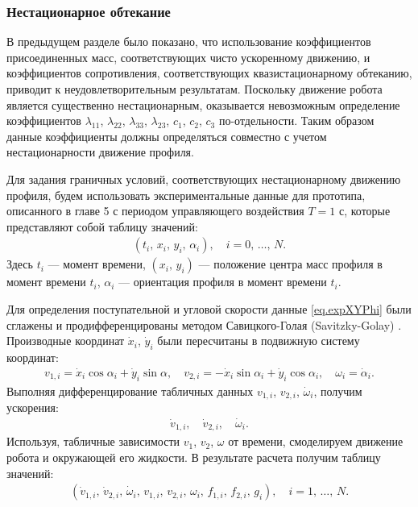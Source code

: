 \subsubsection*{Нестационарное обтекание}\label{ssec.unsteady}


В предыдущем разделе было показано, что использование коэффициентов присоединенных масс, соответствующих чисто ускоренному движению, и коэффициентов сопротивления, соответствующих квазистационарному обтеканию, приводит к неудовлетворительным результатам. Поскольку движение робота является существенно нестационарным, оказывается невозможным определение коэффициентов $\lambda_{11}$, $\lambda_{22}$, $\lambda_{33}$, $\lambda_{23}$, $c_1$, $c_2$, $c_3$ по-отдельности. Таким образом данные коэффициенты должны определяться совместно с учетом нестационарности движение профиля.

Для задания граничных условий, соответствующих нестационарному движению профиля, будем использовать экспериментальные данные для прототипа, описанного в главе 5 с периодом управляющего воздействия $T = 1$ с, которые представляют собой таблицу значений:
\begin{gather}
	(t_i,\, x_i,\, y_i,\, \alpha_i),\quad i = 0,\, \ldots,\, N.\label{eq.expXYPhi}
\end{gather}
Здесь $t_i$ --- момент времени, $(x_i,\, y_i)$ --- положение центра масс профиля в момент времени $t_i$, $\alpha_i$ --- ориентация профиля в момент времени $t_i$.

Для определения поступательной и угловой скорости данные \eqref{eq.expXYPhi} были сглажены и продифференцированы методом Савицкого-Голая (Savitzky-Golay) \cite{Gorry_1990, Savitzky_Golay_1964}. Производные координат $\dot{x}_i$, $\dot{y}_i$ были пересчитаны в подвижную систему координат:
\begin{gather}
	v_{1,i} = \dot{x}_i \cos\alpha_i + \dot{y}_i \sin \alpha,\quad v_{2,i} = -\dot{x}_i \sin\alpha_i + \dot{y}_i \cos\alpha_i,\quad \omega_i = \dot{\alpha}_i.
\end{gather}
Выполняя дифференцирование табличных данных $v_{1,i}$, $v_{2,i}$, $\dot{\omega}_i$, получим ускорения:
\begin{gather}
	\dot{v}_{1,i},\quad \dot{v}_{2,i},\quad \dot{\omega}_i.
\end{gather}
Используя, табличные зависимости $v_1$, $v_2$, $\omega$ от времени, смоделируем движение робота и окружающей его жидкости. В результате расчета получим таблицу значений:
\begin{gather}
	(\dot{v}_{1,i},\, \dot{v}_{2,i},\, \dot{\omega}_i,\, v_{1,i},\, v_{2,i},\, \omega_i,\, f_{1,i},\, f_{2,i},\, g_i),\quad i = 1,\, \ldots,\, N.
\end{gather}

